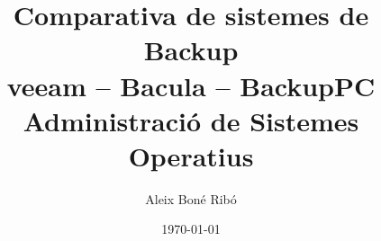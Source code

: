 



\title{Comparativa de sistemes de Backup \\
    \normalfont veeam \--- Bacula \--- BackupPC \\ \vspace{1em}
\Large \normalfont Administració de Sistemes Operatius}
\author{Aleix Bon\'e Rib\'o}
\date{\today}




    



    \tableofcontents



    \setlength{\parskip}{1em plus 0.5em minus 0.2em}

    
    
    
    
    


    \printbibliography[heading=bibintoc]


